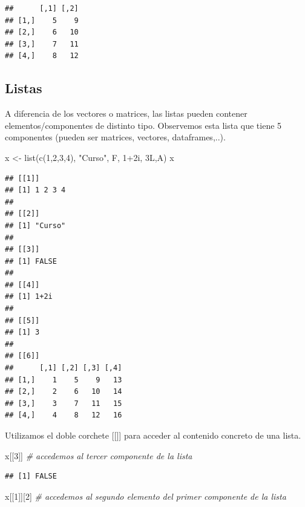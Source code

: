 \documentclass[
]{book}
\newenvironment{Shaded}{\begin{snugshade}}{\end{snugshade}}
\newcommand{\CommentTok}[1]{\textcolor[rgb]{0.56,0.35,0.01}{\textit{#1}}}
\newcommand{\DecValTok}[1]{\textcolor[rgb]{0.00,0.00,0.81}{#1}}
\newcommand{\FunctionTok}[1]{\textcolor[rgb]{0.00,0.00,0.00}{#1}}
\newcommand{\NormalTok}[1]{#1}
\newcommand{\OtherTok}[1]{\textcolor[rgb]{0.56,0.35,0.01}{#1}}
\newcommand{\SpecialCharTok}[1]{\textcolor[rgb]{0.00,0.00,0.00}{#1}}
\newcommand{\StringTok}[1]{\textcolor[rgb]{0.31,0.60,0.02}{#1}}
\begin{document}
\begin{verbatim}
##      [,1] [,2]
## [1,]    5    9
## [2,]    6   10
## [3,]    7   11
## [4,]    8   12
\end{verbatim}

\hypertarget{listas}{%
\subsection{Listas}\label{listas}}

A diferencia de los vectores o matrices, las listas pueden contener elementos/componentes de distinto tipo. Observemos esta lista que tiene 5 componentes (pueden ser matrices, vectores, dataframes,..).

\begin{Shaded}
\begin{Highlighting}[]
\NormalTok{x }\OtherTok{\textless{}{-}} \FunctionTok{list}\NormalTok{(}\FunctionTok{c}\NormalTok{(}\DecValTok{1}\NormalTok{,}\DecValTok{2}\NormalTok{,}\DecValTok{3}\NormalTok{,}\DecValTok{4}\NormalTok{), }\StringTok{"Curso"}\NormalTok{, F, }\DecValTok{1}\SpecialCharTok{+}\NormalTok{2i, 3L,A)}
\NormalTok{x}
\end{Highlighting}
\end{Shaded}

\begin{verbatim}
## [[1]]
## [1] 1 2 3 4
## 
## [[2]]
## [1] "Curso"
## 
## [[3]]
## [1] FALSE
## 
## [[4]]
## [1] 1+2i
## 
## [[5]]
## [1] 3
## 
## [[6]]
##      [,1] [,2] [,3] [,4]
## [1,]    1    5    9   13
## [2,]    2    6   10   14
## [3,]    3    7   11   15
## [4,]    4    8   12   16
\end{verbatim}

Utilizamos el doble corchete {[}{[}{]}{]} para acceder al contenido concreto de una lista.

\begin{Shaded}
\begin{Highlighting}[]
\NormalTok{x[[}\DecValTok{3}\NormalTok{]]  }\CommentTok{\# accedemos al tercer componente de la lista}
\end{Highlighting}
\end{Shaded}

\begin{verbatim}
## [1] FALSE
\end{verbatim}

\begin{Shaded}
\begin{Highlighting}[]
\NormalTok{x[[}\DecValTok{1}\NormalTok{]][}\DecValTok{2}\NormalTok{] }\CommentTok{\# accedemos al segundo elemento del primer componente de la lista}
\end{Highlighting}
\end{Shaded}
\end{document}
